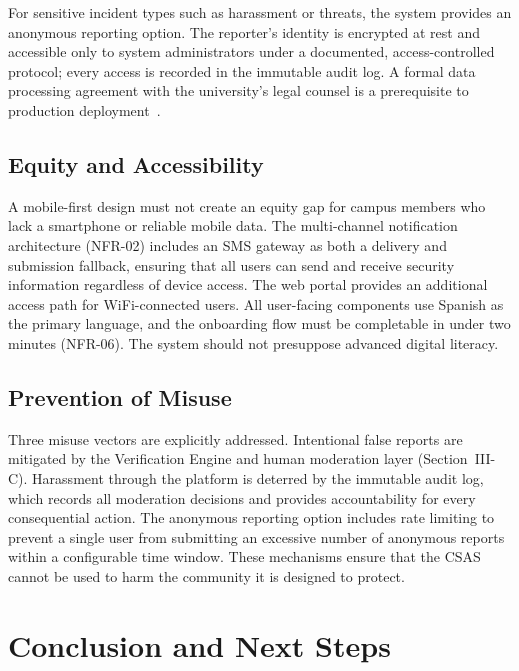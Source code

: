 \documentclass[10pt,twocolumn]{article}
\begin{document}
For sensitive incident types such as harassment or threats, the system
provides an anonymous reporting option. The reporter's identity is
encrypted at rest and accessible only to system administrators under a
documented, access-controlled protocol; every access is recorded in the
immutable audit log. A formal data processing agreement with the
university's legal counsel is a prerequisite to production
deployment~\cite{ley1581}.

\subsection{Equity and Accessibility}

A mobile-first design must not create an equity gap for campus members
who lack a smartphone or reliable mobile data. The multi-channel
notification architecture (NFR-02) includes an SMS gateway as both a
delivery and submission fallback, ensuring that all users can send and
receive security information regardless of device access. The web portal
provides an additional access path for WiFi-connected users. All
user-facing components use Spanish as the primary language, and the
onboarding flow must be completable in under two minutes (NFR-06). The
system should not presuppose advanced digital literacy.

\subsection{Prevention of Misuse}

Three misuse vectors are explicitly addressed. Intentional false reports
are mitigated by the Verification Engine and human moderation layer
(Section~III-C). Harassment through the platform is deterred by the
immutable audit log, which records all moderation decisions and provides
accountability for every consequential action. The anonymous reporting
option includes rate limiting to prevent a single user from submitting
an excessive number of anonymous reports within a configurable time
window. These mechanisms ensure that the CSAS cannot be used to harm
the community it is designed to protect.

\section{Conclusion and Next Steps}
\end{document}
